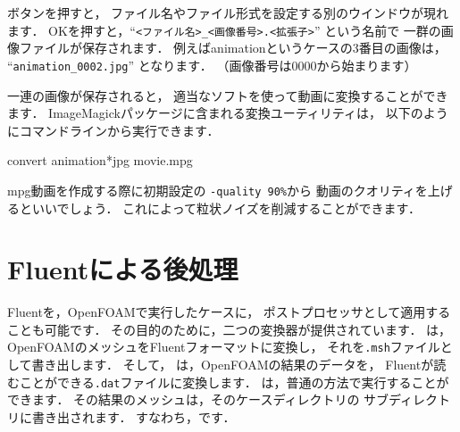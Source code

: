 ボタンを押すと，
ファイル名やファイル形式を設定する別のウインドウが現れます．
OKを押すと，``\verb|<ファイル名>_<画像番号>.<拡張子>|'' という名前で
一群の画像ファイルが保存されます．
例えばanimationというケースの3番目の画像は，
``\verb|animation_0002.jpg|'' となります．
（画像番号は0000から始まります）

一連の画像が保存されると，
適当なソフトを使って動画に変換することができます．
ImageMagickパッケージに含まれる変換ユーティリティは，
以下のようにコマンドラインから実行できます．
\begin{OFverbatim}[terminal]
convert animation*jpg movie.mpg
\end{OFverbatim}
mpg動画を作成する際に初期設定の \verb|-quality 90%|から
動画のクオリティを上げるといいでしょう．
これによって粒状ノイズを削減することができます．



\section{Fluentによる後処理}
\label{sec:6.2}
Fluentを，OpenFOAMで実行したケースに，
ポストプロセッサとして適用することも可能です．
その目的のために，二つの変換器が提供されています．
%
%
は，
OpenFOAMのメッシュをFluentフォーマットに変換し，
それを\texttt{.msh}ファイルとして書き出します．
そして，
%
%
は，OpenFOAMの結果のデータを，
Fluentが読むことができる\texttt{.dat}ファイルに変換します．
は，普通の方法で実行することができます．
その結果のメッシュは，そのケースディレクトリの
%
%
サブディレクトリに書き出されます．
すなわち，です．

